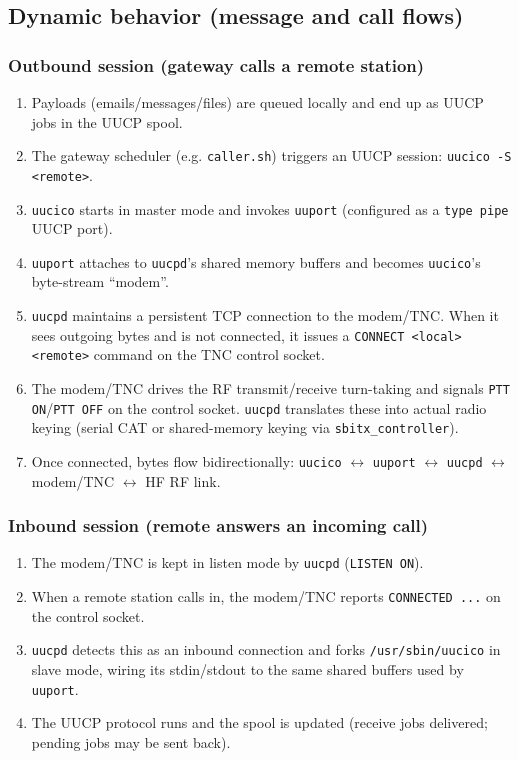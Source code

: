 \subsection{Dynamic behavior (message and call flows)}

\subsubsection{Outbound session (gateway calls a remote station)}
\begin{enumerate}
\item Payloads (emails/messages/files) are queued locally and end up as UUCP jobs in the UUCP spool.
\item The gateway scheduler (e.g. \verb|caller.sh|) triggers an UUCP session: \verb|uucico -S <remote>|.
\item \verb|uucico| starts in master mode and invokes \verb|uuport| (configured as a \verb|type pipe| UUCP port).
\item \verb|uuport| attaches to \verb|uucpd|'s shared memory buffers and becomes \verb|uucico|'s byte-stream ``modem''.
\item \verb|uucpd| maintains a persistent TCP connection to the modem/TNC. When it sees outgoing bytes and is not connected, it issues a
  \verb|CONNECT <local> <remote>| command on the TNC control socket.
\item The modem/TNC drives the RF transmit/receive turn-taking and signals \verb|PTT ON|/\verb|PTT OFF| on the control socket. \verb|uucpd|
  translates these into actual radio keying (serial CAT or shared-memory keying via \verb|sbitx_controller|).
\item Once connected, bytes flow bidirectionally: \verb|uucico| $\leftrightarrow$ \verb|uuport| $\leftrightarrow$ \verb|uucpd| $\leftrightarrow$
  modem/TNC $\leftrightarrow$ HF RF link.
\end{enumerate}

\subsubsection{Inbound session (remote answers an incoming call)}
\begin{enumerate}
\item The modem/TNC is kept in listen mode by \verb|uucpd| (\verb|LISTEN ON|).
\item When a remote station calls in, the modem/TNC reports \verb|CONNECTED ...| on the control socket.
\item \verb|uucpd| detects this as an inbound connection and forks \verb|/usr/sbin/uucico| in slave mode, wiring its stdin/stdout to the same
  shared buffers used by \verb|uuport|.
\item The UUCP protocol runs and the spool is updated (receive jobs delivered; pending jobs may be sent back).
\end{enumerate}

